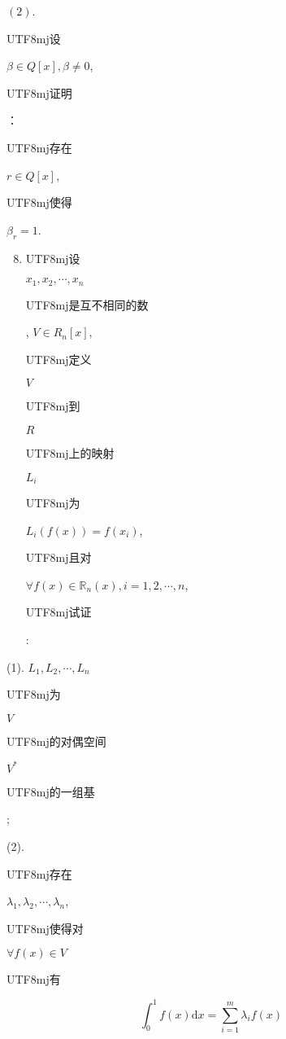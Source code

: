 \documentclass[10pt]{article}
\begin{document}
$(2)$. \begin{CJK}{UTF8}{mj}设\end{CJK} $\beta \in Q[x], \beta \neq 0$, \begin{CJK}{UTF8}{mj}证明\end{CJK}：\begin{CJK}{UTF8}{mj}存在\end{CJK} $r \in Q[x]$, \begin{CJK}{UTF8}{mj}使得\end{CJK} $\beta_{r}=1$.

\begin{enumerate}
  \setcounter{enumi}{7}
  \item \begin{CJK}{UTF8}{mj}设\end{CJK} $x_{1}, x_{2}, \cdots, x_{n}$ \begin{CJK}{UTF8}{mj}是互不相同的数\end{CJK}, $V \in R_{n}[x]$, \begin{CJK}{UTF8}{mj}定义\end{CJK} $V$ \begin{CJK}{UTF8}{mj}到\end{CJK} $R$ \begin{CJK}{UTF8}{mj}上的映射\end{CJK} $L_{i}$ \begin{CJK}{UTF8}{mj}为\end{CJK} $L_{i}(f(x))=f\left(x_{i}\right)$, \begin{CJK}{UTF8}{mj}且对\end{CJK} $\forall f(x) \in \mathbb{R}_{n}(x), i=1,2, \cdots, n$, \begin{CJK}{UTF8}{mj}试证\end{CJK}:
\end{enumerate}
(1). $L_{1}, L_{2}, \cdots, L_{n}$ \begin{CJK}{UTF8}{mj}为\end{CJK} $V$ \begin{CJK}{UTF8}{mj}的对偶空间\end{CJK} $V^{*}$ \begin{CJK}{UTF8}{mj}的一组基\end{CJK};

(2). \begin{CJK}{UTF8}{mj}存在\end{CJK} $\lambda_{1}, \lambda_{2}, \cdots, \lambda_{n}$, \begin{CJK}{UTF8}{mj}使得对\end{CJK} $\forall f(x) \in V$ \begin{CJK}{UTF8}{mj}有\end{CJK}
$$
\int_{0}^{1} f(x) \mathrm{d} x=\sum_{i=1}^{m} \lambda_{i} f(x)
$$
\end{document}
